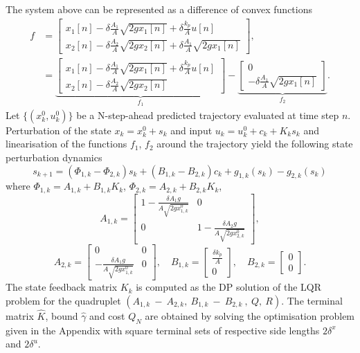 \documentclass[letterpaper, 10 pt, conference]{ieeeconf}
\begin{document}
The system above can be represented as a difference of convex functions
\small
\begin{align*}
f &= \begin{bmatrix}
     x_1[n] - \delta\frac{A_1}{A} \sqrt{2 g x_1[n]} + \delta\frac{k_p}{A} u[n] \\
      x_2[n] - \delta\frac{A_2}{A} \sqrt{2 g x_2[n]} + \delta\frac{A_1}{A} \sqrt{2 g x_1[n]}
\end{bmatrix}, \\
& = \underbrace{\begin{bmatrix}
     x_1[n] - \delta\frac{A_1}{A} \sqrt{2 g x_1[n]} + \delta\frac{k_p}{A} u[n] \\
     x_2[n] - \delta\frac{A_2}{A} \sqrt{2 g x_2[n]}
\end{bmatrix}}_{f_1} - \underbrace{\begin{bmatrix}
     0 \\
     - \delta\frac{A_1}{A} \sqrt{2 g x_1[n]}
\end{bmatrix}}_{f_2}.
\end{align*}
\normalsize
Let $\{(x_k^0, u_k^0)\}$ be a N-step-ahead predicted trajectory evaluated at time step $n$. Perturbation of the state $x_k = x_k^0 + s_k$ and input $u_k = u_k^0 + c_k +K_k s_k$  and linearisation of the functions $f_1$, $f_2$ around the trajectory  yield the following state perturbation dynamics
 \[
 s_{k+1} = (\Phi_{1, k}- \Phi_{2, k}) s_k + (B_{1,k} - B_{2,k}) c_k + g_{1, k}(s_k) -  g_{2, k}(s_k)
 \]
 where $\Phi_{1, k} = A_{1, k} + B_{1, k} K_{k} $, $\Phi_{2, k} = A_{2, k} +  B_{2, k} K_{k}$,
\[
A_{1, k} = \begin{bmatrix}
     1 - \frac{\delta A_1 g}{A \sqrt{2 g x_{1, k}^0}}   & 0\\
      0 & 1 - \frac{\delta A_2 g}{A \sqrt{2 g x_{2, k}^0}}
\end{bmatrix},
\]
\[
A_{2, k} = \begin{bmatrix}
     0  & 0\\
      - \frac{\delta A_1 g}{A \sqrt{2 g x_{1, k}^0}}  & 0
\end{bmatrix}, \quad 
B_{1, k} = \begin{bmatrix}
     \frac{\delta k_p}{A}\\
     0
\end{bmatrix}, \quad
B_{2, k} = \begin{bmatrix}
     0\\
     0
\end{bmatrix}. 
\]
The state feedback matrix $K_k$ is computed as the DP solution of the LQR problem for the quadruplet $(A_{1, k}~-~A_{2, k},~B_{1, k}~-~B_{2, k}~,~Q,~R)$. The terminal matrix $\hat{K}$, bound $\hat{\gamma}$ and cost $Q_N$ are obtained by solving the optimisation problem given in the Appendix with square terminal sets of respective side lengths $2 \delta^x$ and $ 2 \delta^u$.
\end{document}
